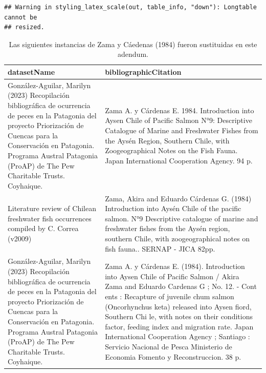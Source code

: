 \documentclass[sn-apa,pdflatex]{sn-jnl}
\newenvironment{Shaded}{\begin{snugshade}}{\end{snugshade}}
\newcommand{\AttributeTok}[1]{\textcolor[rgb]{0.13,0.29,0.53}{#1}}
\newcommand{\CommentTok}[1]{\textcolor[rgb]{0.56,0.35,0.01}{\textit{#1}}}
\newcommand{\ConstantTok}[1]{\textcolor[rgb]{0.56,0.35,0.01}{#1}}
\newcommand{\FunctionTok}[1]{\textcolor[rgb]{0.13,0.29,0.53}{\textbf{#1}}}
\newcommand{\NormalTok}[1]{#1}
\newcommand{\OtherTok}[1]{\textcolor[rgb]{0.56,0.35,0.01}{#1}}
\newcommand{\SpecialCharTok}[1]{\textcolor[rgb]{0.81,0.36,0.00}{\textbf{#1}}}
\newcommand{\StringTok}[1]{\textcolor[rgb]{0.31,0.60,0.02}{#1}}
\begin{document}
\begin{Shaded}
\end{Shaded}

\begin{verbatim}
## Warning in styling_latex_scale(out, table_info, "down"): Longtable cannot be
## resized.
\end{verbatim}

\begingroup\fontsize{8}{10}\selectfont

\begin{longtabu} to 
\caption{\label{tab:unnamed-chunk-228}Las siguientes instancias de Zama y Cáedenas (1984) fueron sustituidas en este adendum.}\\
\toprule
datasetName & bibliographicCitation\\
\midrule
González-Aguilar, Marilyn (2023) Recopilación bibliográfica de ocurrencia de peces en la Patagonia del proyecto Priorización de Cuencas para la Conservación en Patagonia. Programa Austral Patagonia (ProAP) de The Pew Charitable Trusts. Coyhaique. & Zama A. y Cárdenas E. 1984. Introduction into Aysen Chile of Pacific Salmon N°9: Descriptive Catalogue of Marine and Freshwater Fishes from the Aysén Region, Southern Chile, with Zoogeographical Notes on the Fish Fauna. Japan International Cooperation Agency. 94 p.\\
Literature review of Chilean freshwater fish occurrences compiled by C. Correa (v2009) & Zama, Akira and Eduardo Cárdenas G. (1984) Introduction into Aysén Chile of the pacific salmon. N°9 Descriptive catalogue of marine and freshwater fishes from the Aysén region, southern Chile, with zoogeographical notes on fish fauna.. SERNAP - JICA 82pp.\\
González-Aguilar, Marilyn (2023) Recopilación bibliográfica de ocurrencia de peces en la Patagonia del proyecto Priorización de Cuencas para la Conservación en Patagonia. Programa Austral Patagonia (ProAP) de The Pew Charitable Trusts. Coyhaique. & Zama A. y Cárdenas E. (1984). Introduction into Aysen Chile of Pacific Salmon / Akira Zama and Eduardo Cardenas G ; No. 12. - Cont ents : Recapture of juvenile chum salmon (Oncorhynchus keta) released into Aysen fiord, Southern Chi le, with notes on their conditions factor, feeding index and migration rate. Japan International Cooperation Agency ; Santiago : Servicio Nacional de Pesca Ministerio de Economia Fomento y Reconstruccion. 38 p.\\
\bottomrule
\end{longtabu}
\endgroup{}
\end{document}
